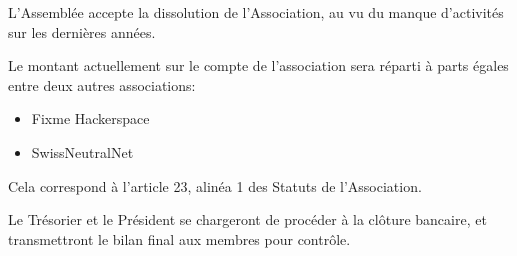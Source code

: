 \documentclass[12pt,twoside]{report}
\begin{document}
L'Assemblée accepte la dissolution de l'Association, au vu du
manque d'activités sur les dernières années.

Le montant actuellement sur le compte de l'association sera réparti
à parts égales entre deux autres associations:
\begin{itemize}
\item Fixme Hackerspace
\item SwissNeutralNet
\end{itemize}

Cela correspond à l'article 23, alinéa 1 des Statuts de l'Association.

Le Trésorier et le Président se chargeront de procéder à la clôture bancaire,
et transmettront le bilan final aux membres pour contrôle.
\end{document}
